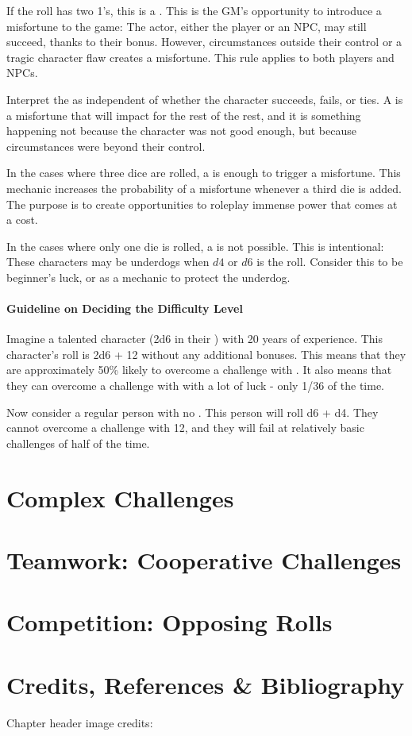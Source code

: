 If the roll has two 1's, this is a .
This is the GM's opportunity to introduce a misfortune to the game:
The actor, either the player or an NPC, may still succeed, thanks to their bonus.
However, circumstances outside their control or a tragic character flaw creates a misfortune.
This rule applies to both players and NPCs.

Interpret the  as independent of whether the character
succeeds, fails, or ties. A  is a misfortune that will
impact for the rest of the rest, and it is something happening not
because the character was not good enough, but because circumstances were
beyond their control.

In the cases where three dice are rolled,
a  is enough to trigger a misfortune.
This mechanic increases the probability of a misfortune
whenever a third die is added. The purpose is to create
opportunities to roleplay immense power that comes at a
cost.

In the cases where only one die is rolled,
a  is not possible. This is intentional:
These characters may be underdogs when $d4$ or $d6$ is the roll.
Consider this to be beginner's luck, or as a mechanic to protect the
underdog.

\paragraph*{Guideline on Deciding the Difficulty Level}

Imagine a talented character (2d6 in their ) with 20 years of experience.
This character's roll is 2d6 + 12 without any additional bonuses.
This means that they are approximately 50\% likely to overcome a challenge with .
It also means that they can overcome a challenge with  with a lot of luck - only 1/36 of the time.\\

\marginpar{
	\footnotesize
	
}

Now consider a regular person with no . This person will roll d6 + d4.
They cannot overcome a challenge with 12,
and they will fail at relatively basic challenges of  half of the time.

\section{Complex Challenges}

\section{Teamwork: Cooperative Challenges}

\section{Competition: Opposing Rolls}


\section*{Credits, References \& Bibliography}

Chapter header image credits: \cite{dice_image}

\printbibliography[heading=none]
